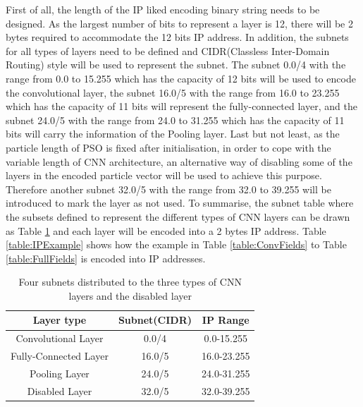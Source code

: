 \documentclass[conference]{IEEEtran}
\begin{document}
First of all, the length of the IP liked encoding binary string needs to be designed. As the largest number of bits to represent a layer is 12, there will be 2 bytes required to accommodate the 12 bits IP address. 
In addition, the subnets for all types of layers need to be defined and CIDR(Classless Inter-Domain Routing) \cite{CIDR:Fuller} style will be used to represent the subnet. The subnet 0.0/4 with the range from 0.0 to 15.255 which has the capacity of 12 bits will be used to encode the convolutional layer, the subnet 16.0/5 with the range from 16.0 to 23.255 which has the capacity of 11 bits will represent the fully-connected layer, and the subnet 24.0/5 with the range from 24.0 to 31.255 which has the capacity of 11 bits will carry the information of the Pooling layer. 
Last but not least, as the particle length of PSO is fixed after initialisation,  in order to cope with the variable length of CNN architecture, an alternative way of disabling some of the layers in the encoded particle vector will be used to achieve this purpose. Therefore another subnet 32.0/5 with the range from 32.0 to 39.255 will be introduced to mark the layer as not used. 
To summarise, the subnet table where the subsets defined to represent the different types of CNN layers can be drawn as Table \ref{table:Subnets} and each layer will be encoded into a 2 bytes IP address. Table \ref{table:IPExample} shows how the example in Table \ref{table:ConvFields} to Table \ref{table:FullFields} is encoded into IP addresses. 

\begin{table}[!t]
	\renewcommand{\arraystretch}{1.3}
	\caption{Four subnets distributed to the three types of CNN layers and the disabled layer}
	\label{table:Subnets}
	\centering
	\begin{tabular}{|c|c|c|}
		\hline
		Layer type & Subnet(CIDR) & IP Range\\
		\hline
		Convolutional Layer & 0.0/4 & 0.0-15.255\\
		\hline
		Fully-Connected Layer & 16.0/5 & 16.0-23.255\\
		\hline
		Pooling Layer & 24.0/5 & 24.0-31.255\\
		\hline
		Disabled Layer & 32.0/5 & 32.0-39.255\\
		\hline
	\end{tabular}
\end{table}
\end{document}

